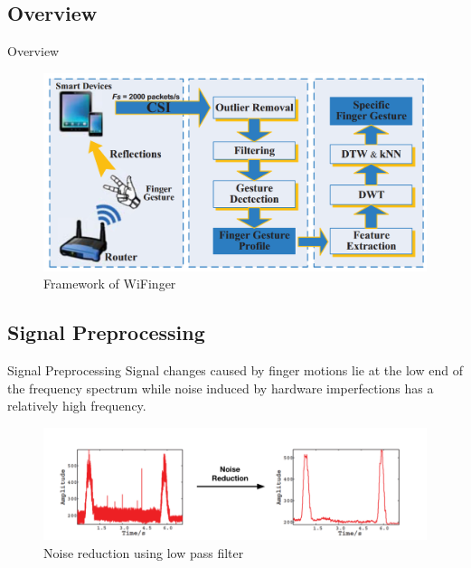 \documentclass{beamer}
\begin{document}
\subsection{Overview}
\begin{frame}{Overview}
	\begin{center}
		\begin{figure}
			\includegraphics[width=1.\textwidth]{Images/overview.png}
			\caption{Framework of WiFinger~\cite{li2016wifinger}}
		\end{figure}
     \end{center}
\end{frame}


\subsection{Signal Preprocessing}
\begin{frame}{Signal Preprocessing}
Signal changes caused by finger motions lie at the low end of the frequency spectrum while noise induced by hardware imperfections has a relatively high frequency.
	\begin{center}
		\begin{figure}
			\includegraphics[width=1.\textwidth]{Images/quals-part-1-denosing.png}
			\caption{Noise reduction using low pass filter~\cite{li2016wifinger}}
		\end{figure}
     \end{center}
\end{frame}
\end{document}
